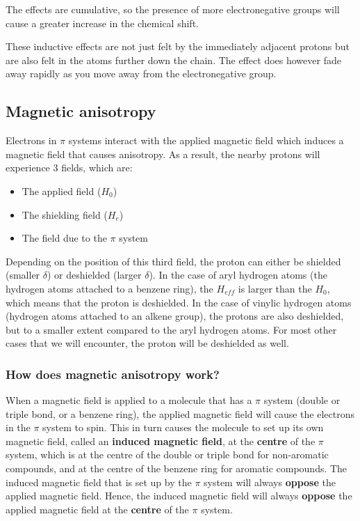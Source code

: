 \documentclass[11pt]{article}
\begin{document}
The effects are cumulative, so the presence of more electronegative groups will cause a greater increase in the chemical shift.

These inductive effects are not just felt by the immediately adjacent protons but are also felt in the atoms further down the chain. The effect does however fade away rapidly as you move away from the electronegative group.

\newpage

\subsection{Magnetic anisotropy}
\label{sec:orgfec7031}
Electrons in \(\pi\) systems interact with the applied magnetic field which induces a magnetic field that causes anisotropy. As a result, the nearby protons will experience 3 fields, which are:
\begin{itemize}
\item The applied field (\(H_0\))
\item The shielding field (\(H_e\))
\item The field due to the \(\pi\) system
\end{itemize}

Depending on the position of this third field, the proton can either be shielded (smaller \(\delta\)) or deshielded (larger \(\delta\)). In the case of aryl hydrogen atoms (the hydrogen atoms attached to a benzene ring), the \(H_{eff}\) is larger than the \(H_0\), which means that the proton is deshielded. In the case of vinylic hydrogen atoms (hydrogen atoms attached to an alkene group), the protons are also deshielded, but to a smaller extent compared to the aryl hydrogen atoms. For most other cases that we will encounter, the proton will be deshielded as well.

\newpage

\subsubsection{How does magnetic anisotropy work?}
\label{sec:org5c9919a}
When a magnetic field is applied to a molecule that has a \(\pi\) system (double or triple bond, or a benzene ring), the applied magnetic field will cause the electrons in the \(\pi\) system to spin. This in turn causes the molecule to set up its own magnetic field, called an \textbf{induced magnetic field}, at the \textbf{centre} of the \(\pi\) system, which is at the centre of the double or triple bond for non-aromatic compounds, and at the centre of the benzene ring for aromatic compounds. The induced magnetic field that is set up by the \(\pi\) system will always \textbf{oppose} the applied magnetic field. Hence, the induced magnetic field will always \textbf{oppose} the applied magnetic field at the \textbf{centre} of the \(\pi\) system.
\\[0pt]
\end{document}

